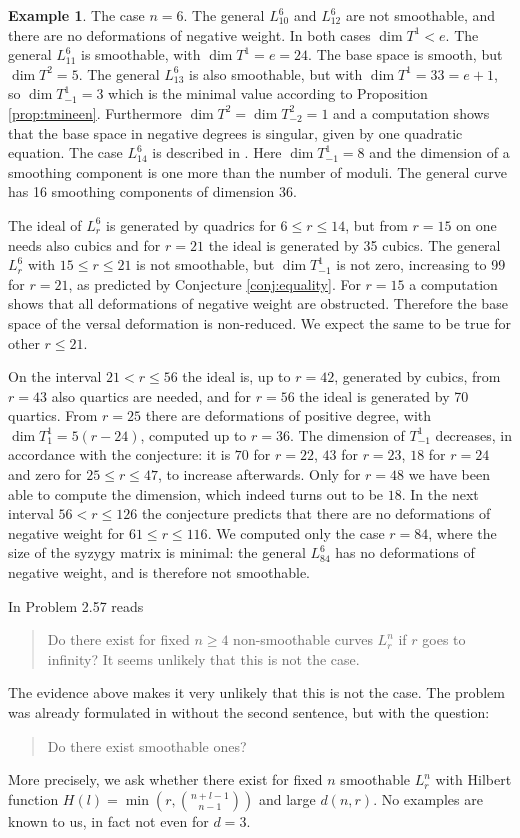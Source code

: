 \documentclass{amsart}
\renewcommand{\ell}{l}
\theoremstyle{definition}
\newtheorem{ex}[thm]{Example}
\theoremstyle{remark}
\begin{document}
\begin{ex} The case $n=6$.
The general $L_{10}^6$ and $L_{12}^6$ are not smoothable, and there are no deformations
of negative weight. In both cases $\dim T^1 < e$.
The general $L_{11}^6$ is smoothable, with $\dim T^1=e=24$. The base space is smooth,
but $\dim T^2=5$.
The general $L_{13}^6$ is also smoothable, but with  $\dim T^1=33=e+1$, so $\dim T^1_{-1}=3$
which is  the minimal value according to Proposition \ref{prop:tmineen}. Furthermore
$\dim T^2 = \dim T^2_{-2} =1$ and a computation shows that the base space in negative degrees is 
singular, given by one quadratic equation.
The case $L_{14}^6$ is described in \cite{St3}. 
Here $\dim T^1_{-1}=8$ and the dimension of a smoothing component is one more than the
number of moduli. The general curve
has 16 smoothing components of dimension 36.

The ideal of $L_r^6$ is generated by quadrics for $6\leq r\leq 14$, but from $r=15$ on one needs
also cubics and for $r=21$ the ideal is generated by 35  cubics. 
The general $L_r^6$ with $15\leq r\leq 21$ is not smoothable, but $ \dim T^1_{-1}$ is not zero,
increasing to 99 for $r=21$, as predicted by Conjecture \ref{conj:equality}.
For $r=15$ a computation shows that all deformations
of negative weight are obstructed.
Therefore the base space of the versal deformation is non-reduced.
We expect the same to be true for other $r\leq 21$.

On  the interval $21< r \leq 56$  the ideal is, up to $r=42$, generated by cubics,
from $r=43$ also quartics are needed, and for $r=56$ the ideal is generated by 70
quartics.
From $r=25$ there are deformations of positive degree, with $\dim T^1_1 = 5(r-24)$, 
computed up to $r=36$.
The dimension of $T^1_{-1}$ decreases, in accordance with the conjecture: 
it is $70$ for $r=22$, $43$ for $r=23$, $18$ for $r=24$
and zero for $25\leq r \leq 47$, to increase afterwards. Only for $r=48$ we have been able to compute the dimension, which indeed turns out  to be $18$. 
In the next interval $56<r\leq 126$ the conjecture predicts that there are no deformations
of negative weight for $61\leq r \leq 116$. We computed only the case  $r=84$, where the size
of the  syzygy matrix 
is minimal:  the general  $L_{84}^6$ has no
deformations of negative weight, and is therefore not smoothable.
\end{ex}



In \cite{Gr2} Problem 2.57 reads
\begin{quote}
Do there exist for fixed $n \geq 4$ non-smoothable curves $L_r^n$
if $r$ goes to infinity? It seems unlikely that this is not the case.
\end{quote}
%
The evidence above makes it very unlikely that this is not  the case. 
The problem was already formulated in \cite{Gr} without the second sentence, but 
with the question:
%
\begin{quote}
Do there exist smoothable ones?
\end{quote}
%
More precisely, we ask whether  there exist for fixed $n$ smoothable $L_r^n$
 with  Hilbert function
$H(\ell) = \min\left(r,\binom{n+\ell-1}{n-1}\right)$ and large $d(n,r)$.
No examples are known to us, in fact not even for $d=3$.
\end{document}
